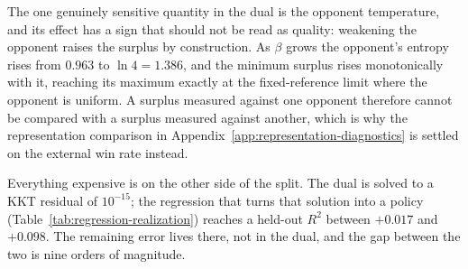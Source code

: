 \documentclass{article}
\theoremstyle{remark}
\theoremstyle{plain}
\begin{document}
The one genuinely sensitive quantity in the dual is the opponent temperature, and its effect has a
sign that should not be read as quality: weakening the opponent raises the surplus by construction.
As $\beta$ grows the opponent's entropy rises from $0.963$ to $\ln 4=1.386$, and the minimum
surplus rises monotonically with it, reaching its maximum exactly at the fixed-reference limit where
the opponent is uniform. A surplus measured against one opponent therefore cannot be compared with a
surplus measured against another, which is why the representation comparison in
Appendix~\ref{app:representation-diagnostics} is settled on the external win rate instead.

Everything expensive is on the other side of the split. The dual is solved to a KKT residual of
$10^{-15}$; the regression that turns that solution into a policy
(Table~\ref{tab:regression-realization}) reaches a held-out $R^2$ between $+0.017$ and $+0.098$.
The remaining error lives there, not in the dual, and the gap between the two is nine orders of
magnitude.
\end{document}
